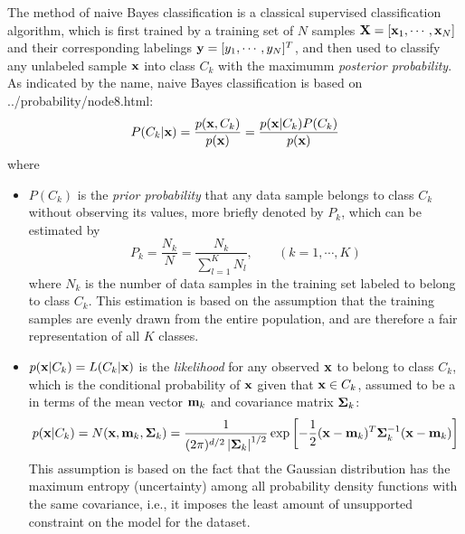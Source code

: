 \documentclass{article}
\begin{document}
The method of naive Bayes classification is a classical supervised
classification algorithm, which is first trained by a training set 
of $N$ samples ${\bf X}=[{\bf x}_1,\cdots,{\bf x}_N]$ and their 
corresponding labelings ${\bf y}=[y_1,\cdots,y_N]^T$, and then used 
to classify any unlabeled sample ${\bf x}$ into class $C_k$ with the
maximumm {\em posterior probability}. As indicated by the name, naive
Bayes classification is based on 
{../probability/node8.html}:
\begin{equation}
  P(C_k|{\bf x})=\frac{p({\bf x},C_k)}{p({\bf x})}  
  =\frac{p({\bf x}|C_k)P(C_k)}{p({\bf x})}  
  \label{posteriorNB}
\end{equation}
where 
\begin{itemize}
\item $P(C_k)$ is the {\em prior probability} that any data sample
  belongs to class $C_k$ without observing its values, more briefly 
  denoted by $P_k$, which can be estimated by
  \begin{equation}
    P_k=\frac{N_k}{N}=\frac{N_k}{\sum_{l=1}^K N_l},
    \;\;\;\;\;\;\;(k=1,\cdots,K)
    \label{priorNB}
  \end{equation}
  where $N_k$ is the number of data samples in the training set 
  labeled to belong to class $C_k$. This estimation is based on 
  the assumption that the training samples are evenly drawn from 
  the entire population, and are therefore a fair representation 
  of all $K$ classes.

\item 
  $p({\bf x}|C_k)=L(C_k|{\bf x})$ is the {\em likelihood} for 
  any observed ${\bf x}$ to belong to class $C_k$, which is the 
  conditional probability of ${\bf x}$ given that ${\bf x}\in C_k$, 
  assumed to be a 
   in 
  terms of the mean vector ${\bf m}_k$ and covariance matrix 
  ${\bf\Sigma}_k$:
  \begin{equation}
    p({\bf x}|C_k)=N({\bf x},{\bf m}_k,{\bf \Sigma}_k)
    =\frac{1}{(2\pi)^{d/2} \left| {\bf \Sigma}_k\right|^{1/2}}
    \exp\left[-\frac{1}{2}({\bf x}-{\bf m}_k)^T{\bf \Sigma}_k^{-1}
      ({\bf x}-{\bf m}_k)\right]
    \label{likelihoodNB}
  \end{equation}
  This assumption is based on the fact that the Gaussian distribution
  has the maximum entropy (uncertainty) among all probability density 
  functions with the same covariance, i.e., it imposes the least amount 
  of unsupported constraint on the model for the dataset.


\end{itemize}
\end{document}
